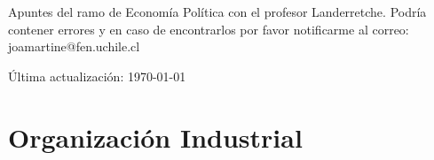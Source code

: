 \documentclass[12pt]{book}
\begin{document}
Apuntes del ramo de Economía Política con el profesor Landerretche. Podría contener errores y en caso de encontrarlos por favor notificarme al correo: joamartine@fen.uchile.cl

Última actualización: \today

\newpage

\setcounter{chapter}{3}

\chapter{Organización Industrial}



\newpage



\newpage

\begin{appendices}
    
\end{appendices}
\end{document}
